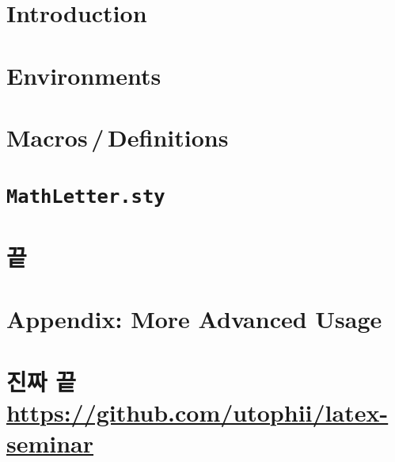 \documentclass[10pt]{beamer}
\begin{document}
\begin{frame}[plain]
  \maketitle
\end{frame}

\section{Introduction}


\section{Environments}


\section{Macros\,/\,Definitions}


\section{\texttt{MathLetter.sty}}


\section{끝}

\section{Appendix: More Advanced Usage}


\def\titleoffinalslide{\texorpdfstring{진짜 끝\endgraf\small \url{https://github.com/utophii/latex-seminar}}{진짜 끝 \small \url{https://github.com/utophii/latex-seminar}}}
\section{\titleoffinalslide}
\end{document}
